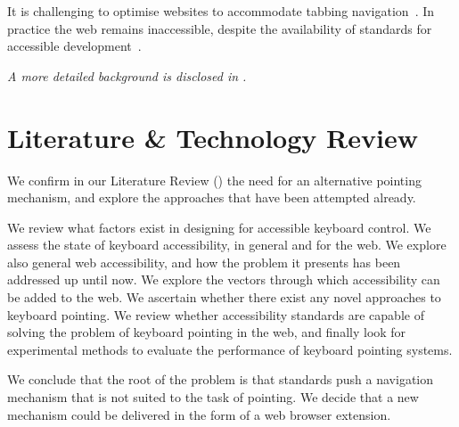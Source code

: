 \documentclass[11pt,openright,a4paper]{report}
\begin{document}
It is challenging to optimise websites to accommodate tabbing navigation~\cite{watanabe2012using}. In practice the web remains inaccessible, despite the availability of standards for accessible development~\cite{hoffman2005emerging}.

\textit{A more detailed background is disclosed in .}
\section{Literature \& Technology Review}
We confirm in our Literature Review () the need for an alternative pointing mechanism, and explore the approaches that have been attempted already.

We review what factors exist in designing for accessible keyboard control. We assess the state of keyboard accessibility, in general and for the web. We explore also general web accessibility, and how the problem it presents has been addressed up until now. We explore the vectors through which accessibility can be added to the web. We ascertain whether there exist any novel approaches to keyboard pointing. We review whether accessibility standards are capable of solving the problem of keyboard pointing in the web, and finally look for experimental methods to evaluate the performance of keyboard pointing systems.

We conclude that the root of the problem is that standards push a navigation mechanism that is not suited to the task of pointing. We decide that a new mechanism could be delivered in the form of a web browser extension.
\end{document}
